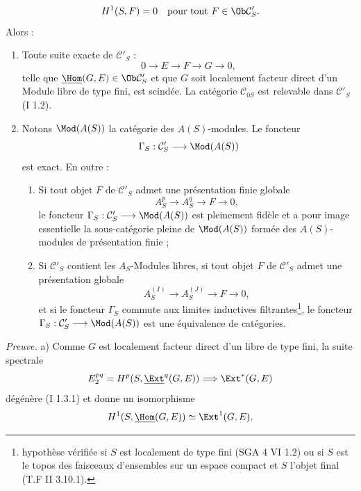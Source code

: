 \[
H^1(S,F)=0\quad
\text{pour tout }F\in\Ob\mathcal C'_S.
\]
Alors :
\begin{enumerate}[label=\alph*)]
\item Toute suite exacte de $\mathcal C'_S$ :
\[
0\longrightarrow E\longrightarrow F\longrightarrow G\longrightarrow0,
\]
telle que $\underline{\Hom}(G,E)
\in\Ob\mathcal C'_S$ et que $G$ soit localement facteur direct d'un Module libre de type fini, est scindée. La catégorie $\mathcal C_{0S}$ est relevable dans $\mathcal C'_S$ (I 1.2).
\item Notons $\Mod(A(S))$ la catégorie des $A(S)$-modules. Le foncteur
\[
\Gamma_S:\mathcal C'_S\longrightarrow\Mod(A(S))
\]
est exact. En outre :
\begin{enumerate}[label=(\roman*)]
\item Si tout objet $F$ de $\mathcal C'_S$ admet une présentation finie globale
\[
A_S^p\longrightarrow A_S^q\longrightarrow F\longrightarrow0,
\]
le foncteur $\Gamma_S:\mathcal C'_S\longrightarrow\Mod(A(S))$ est pleinement fidèle et a pour image essentielle la sous-catégorie pleine de $\Mod(A(S))$ formée des $A(S)$-modules de présentation finie ;
\item Si $\mathcal C'_S$ contient les $A_S$-Modules libres, si tout objet $F$ de $\mathcal C'_S$ admet une présentation globale
\[
A_S^{(I)}\longrightarrow A_S^{(J)}\longrightarrow F\longrightarrow0,
\]
et si le foncteur $\Gamma_S$ commute aux limites inductives filtrantes\footnote{hypothèse vérifiée si $S$ est localement de type fini (SGA 4 VI 1.2) ou si $S$ est le topos des faisceaux d'ensembles sur un espace compact et $S$ l'objet final (T.F II 3.10.1).}, le foncteur $\Gamma_S:\mathcal C'_S\longrightarrow\Mod(A(S))$ est une équivalence de catégories.
\end{enumerate}
\end{enumerate}

\emph{Preuve.} a) Comme $G$ est localement facteur direct d'un libre de type fini, la suite spectrale
\[
E_2^{pq}=H^p(S,\underline{\Ext}^q(G,E))\Longrightarrow\Ext^{*}(G,E)
\]
dégénère (I 1.3.1) et donne un isomorphisme
\[
H^1(S,\underline{\Hom}(G,E))\simeq\Ext^1(G,E),
\]
